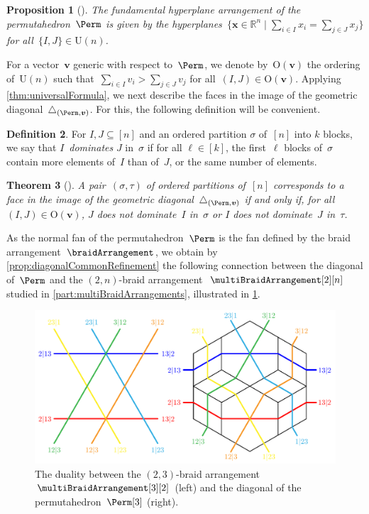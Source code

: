\documentclass{amsart}
\newcommand{\darkblue}{\color{darkblue}} %
\newtheorem{theorem}{Theorem}[section]
\newtheorem{proposition}[theorem]{Proposition}
\theoremstyle{definition}
\newtheorem{definition}[theorem]{Definition}
\newcommand{\R}{\mathbb{R}} %
\renewcommand{\b}[1]{{\boldsymbol{#1}}} %
\newcommand{\Un}{\mathrm{U}} %
\newcommand{\Or}{\mathrm{O}} %
\newcommand{\bigset}[2]{\big\{ #1 \;\big|\; #2 \big\}} %
\newcommand{\defn}[1]{\textsl{\darkblue #1}} %
\renewcommand{\b}[1]{\boldsymbol{#1}} %
\begin{document}
\begin{proposition}[{\cite[Sect.~3.1]{LA21}}]
The fundamental hyperplane arrangement of the permutahedron~$\Perm$ is given by the hyperplanes~$\bigset{\b{x} \in \R^n}{\sum\limits_{i \in I} x_i = \sum\limits_{j \in J} x_j}$ for all~$\{I,J\} \in \Un(n)$.
\end{proposition}

For a vector~$\b{v}$ generic with respect to~$\Perm$, we denote by~$\Or(\b{v})$ the ordering of~$\Un(n)$ such that~$\sum_{i \in I} v_i > \sum_{j \in J} v_j$ for all~$(I,J) \in \Or(\b{v})$.
Applying \cref{thm:universalFormula}, we next describe the faces in the image of the geometric diagonal~$\triangle_{(\Perm, \b{v})}$.
For this, the following definition will be convenient.

\begin{definition}
    \label{def:domination}
For $I,J \subseteq [n]$ and an ordered partition $\sigma$ of~$[n]$ into $k$ blocks, we say that $I$~\defn{dominates} $J$ in~$\sigma$ if for all $\ell \in [k]$, the first~$\ell$ blocks of~$\sigma$ contain more elements of~$I$ than of~$J$, or the same number of elements.
\end{definition}

\begin{theorem}[{\cite[Thm.~3.16]{LA21}}]
\label{thm:IJ-description}
A pair~$(\sigma, \tau)$ of ordered partitions of~$[n]$ corresponds to a face in the image of the geometric diagonal~$\triangle_{(\Perm, \b{v})}$ if and only if, for all~$(I,J) \in \Or(\b{v})$, $J$ does not dominate~$I$ in~$\sigma$ or $I$ does not dominate~$J$ in~$\tau$.
\end{theorem}

As the normal fan of the permutahedron~$\Perm$ is the fan defined by the braid arrangement~$\braidArrangement$, we obtain by \cref{prop:diagonalCommonRefinement} the following connection between the diagonal of~$\Perm$ and the $(2,n)$-braid arrangement~$\multiBraidArrangement[2][n]$ studied in \cref{part:multiBraidArrangements}, illustrated in \cref{fig:diagonalPermutahedron1}.
%
\begin{figure}
	\includegraphics[scale=.9]{diagonalPermutahedron1}
	\caption{The duality between the $(2,3)$-braid arrangement~$\multiBraidArrangement[3][2]$ (left) and the diagonal of the permutahedron~$\Perm[3]$ (right).}
	\label{fig:diagonalPermutahedron1}
\end{figure}
\end{document}
